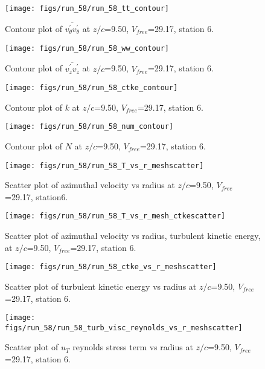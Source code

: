 \begin{figure}[H]
\centering
\texttt{[image: figs/run\_58/run\_58\_tt\_contour]}
\caption{Contour plot of $\overline{v_{\theta}^{\prime} v_{\theta}^{\prime}}$ at $z/c$=9.50, $V_{free}$=29.17, station 6.}
\end{figure}


\begin{figure}[H]
\centering
\texttt{[image: figs/run\_58/run\_58\_ww\_contour]}
\caption{Contour plot of $\overline{v_{z}^{\prime} v_{z}^{\prime}}$ at $z/c$=9.50, $V_{free}$=29.17, station 6.}
\end{figure}


\begin{figure}[H]
\centering
\texttt{[image: figs/run\_58/run\_58\_ctke\_contour]}
\caption{Contour plot of $k$ at $z/c$=9.50, $V_{free}$=29.17, station 6.}
\end{figure}


\begin{figure}[H]
\centering
\texttt{[image: figs/run\_58/run\_58\_num\_contour]}
\caption{Contour plot of $N$ at $z/c$=9.50, $V_{free}$=29.17, station 6.}
\end{figure}


\begin{figure}[H]
\centering
\texttt{[image: figs/run\_58/run\_58\_T\_vs\_r\_meshscatter]}
\caption{Scatter plot of azimuthal velocity vs radius at $z/c$=9.50, $V_{free}$=29.17, station6.}
\end{figure}


\begin{figure}[H]
\centering
\texttt{[image: figs/run\_58/run\_58\_T\_vs\_r\_mesh\_ctkescatter]}
\caption{Scatter plot of azimuthal velocity vs radius, turbulent kinetic energy, at $z/c$=9.50, $V_{free}$=29.17, station 6.}
\end{figure}


\begin{figure}[H]
\centering
\texttt{[image: figs/run\_58/run\_58\_ctke\_vs\_r\_meshscatter]}
\caption{Scatter plot of turbulent kinetic energy vs radius at $z/c$=9.50, $V_{free}$=29.17, station 6.}
\end{figure}


\begin{figure}[H]
\centering
\texttt{[image: figs/run\_58/run\_58\_turb\_visc\_reynolds\_vs\_r\_meshscatter]}
\caption{Scatter plot of $
u_T$ reynolds stress term vs radius at $z/c$=9.50, $V_{free}$=29.17, station 6.}
\end{figure}


